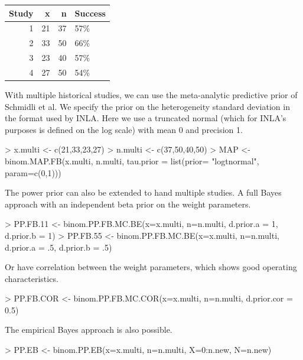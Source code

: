 \documentclass{article}
\begin{document}
\begin{table}[ht]
\centering
\begin{tabular}{rrrl}
  \hline
Study & x & n & Success \\ 
  \hline
1 & 21 & 37 & 57\% \\ 
  2 & 33 & 50 & 66\% \\ 
  3 & 23 & 40 & 57\% \\ 
  4 & 27 & 50 & 54\% \\ 
   \hline
\end{tabular}
\end{table}

With multiple historical studies, we can use the meta-analytic predictive prior of Schmidli et al. We specify the prior on the heterogeneity standard deviation in the format used by INLA. Here we use a truncated normal (which for INLA's purposes is defined on the log scale) with mean 0 and precision 1. 
\begin{Schunk}
\begin{Sinput}
> x.multi <- c(21,33,23,27)
> n.multi <- c(37,50,40,50)
> MAP <- binom.MAP.FB(x.multi, n.multi, tau.prior = list(prior= "logtnormal", param=c(0,1)))
\end{Sinput}
\end{Schunk}

The power prior can also be extended to hand multiple studies. A full Bayes approach with an independent beta prior on the weight parameters.
\begin{Schunk}
\begin{Sinput}
> PP.FB.11 <- binom.PP.FB.MC.BE(x=x.multi, n=n.multi, d.prior.a = 1, d.prior.b = 1)
> PP.FB.55 <- binom.PP.FB.MC.BE(x=x.multi, n=n.multi, d.prior.a = .5, d.prior.b = .5)
\end{Sinput}
\end{Schunk}
Or have correlation between the weight parameters, which shows good operating characteristics.
\begin{Schunk}
\begin{Sinput}
> PP.FB.COR <- binom.PP.FB.MC.COR(x=x.multi, n=n.multi, d.prior.cor = 0.5)
\end{Sinput}
\end{Schunk}
The empirical Bayes approach is also possible.
\begin{Schunk}
\begin{Sinput}
> PP.EB <- binom.PP.EB(x=x.multi, n=n.multi, X=0:n.new, N=n.new)
\end{Sinput}
\end{Schunk}
\end{document}
